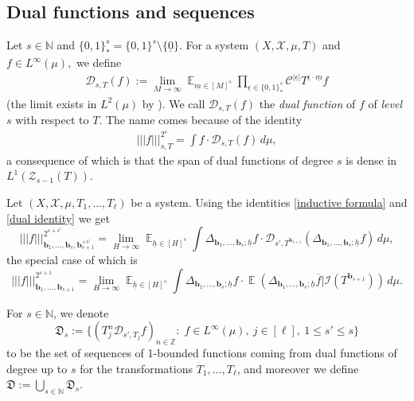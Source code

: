 \documentclass[11pt]{amsart}
\theoremstyle{definition}
\newcommand{\N}{{\mathbb N}}
\newcommand{\Z}{{\mathbb Z}}
\newcommand{\CC}{{\mathcal C}}
\newcommand{\CD}{{\mathcal D}}
\newcommand{\CI}{{\mathcal I}}
\newcommand{\CX}{{\mathcal X}}
\newcommand{\CZ}{{\mathcal Z}}
\newcommand{\FD}{{\mathfrak D}}
\renewcommand{\b}{{\textbf{b}}}
\newcommand{\uh}{{\underline{h}}}
\newcommand{\um}{{\underline{m}}}
\newcommand{\ueps}{{\underline{\epsilon}}}
\newcommand{\nnorm}[1]{\lvert\!|\!| #1|\!|\!\rvert}
\DeclareMathOperator*{\E}{\mathbb{E}}
\begin{document}
\subsection{Dual functions and sequences}\label{SS:dual}
Let $s\in\N$ and $\{0,1\}^s_* = \{0,1\}^s\setminus\{\underline{0}\}$. For a system $(X, \CX, \mu, T)$ and $f\in L^\infty(\mu),$ we define
\begin{align*}
    \CD_{s, T}(f) := \lim_{M\to\infty}\E_{\um\in [M]^s}\prod_{\ueps\in\{0,1\}^s_*}\CC^{|\ueps|}T^{\ueps\cdot\um}f
\end{align*}
(the limit exists in $L^2(\mu)$ by \cite{HK05a}).
  We call $\CD_{s,T}(f)$ the \emph{dual function} of $f$ of \emph{level} $s$ with respect to $T$.
  The name comes because of the identity
\begin{align}\label{dual identity}
    \nnorm{f}_{s, T}^{2^s} = \int f \cdot \CD_{s, T}(f)\, d\mu,
\end{align}
a consequence of which is that the span of dual functions of degree $s$ is dense in $L^1(\CZ_{s-1}(T))$.

Let $(X, \CX, \mu, T_1, \ldots, T_\ell)$ be a system.
Using  the identities \eqref{inductive formula} and  \eqref{dual identity} we get
\begin{equation*}%
\nnorm{f}_{{\b_1}, \ldots, {\b_{s}}, \b_{s+1}^{\times s'}}^{2^{s+s'}}=\lim_{H\to\infty}\E_{\uh\in [H]^s}\int  \Delta_{{\b_1}, \ldots, {\b_{s}}; \uh} f \cdot \CD_{s', T^{\b_{s+1}}}(\Delta_{{\b_1}, \ldots, {\b_{s}}; \uh}f)\, d\mu,
\end{equation*}
the special case of which is
\begin{equation*}%
\nnorm{f}_{{\b_1}, \ldots, \b_{s+1}}^{2^{s+1}} = \lim_{H\to\infty}\E_{\uh\in [H]^s} \int  \Delta_{{\b_1}, \ldots, {\b_{s}}; \uh}f \cdot \E(\Delta_{{\b_1}, \ldots, {\b_{s}}; \uh}\overline{f}|\CI(T^{\b_{s+1}}))\, d\mu.
\end{equation*}

For $s\in\N$, we denote
 \begin{equation*}%
 \FD_s := \{(T_j^n \CD_{s', T_j}f)_{n\in\Z}\colon\; f\in L^\infty(\mu),\ j\in[\ell],\ 1\leq s'\leq s\}
 \end{equation*}
to be the set of sequences of 1-bounded functions coming from dual functions of degree up to $s$ for the transformations $T_1,\ldots, T_\ell$, and moreover we define $\FD := \bigcup_{s\in\N}\FD_s$.
\end{document}
